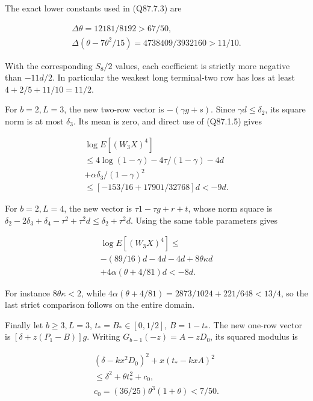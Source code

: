 The exact lower constants used in (Q87.7.3) are

\[
\begin{gathered}
\Delta\theta=12181/8192>67/50,\qquad\\
\Delta(\theta-7\theta^2/15)=4738409/3932160>11/10.
\end{gathered}
\]

With the corresponding \(S_8/2\) values, each coefficient is
strictly more negative than \(-11d/2\). In particular the weakest
long terminal-two row has loss at least \(4+2/5+11/10=\allowbreak 11/2\).

For \(b=\allowbreak 2,\allowbreak  L=\allowbreak 3\), the new two-row vector is \(-(\gamma g+s)\).
Since \(\gamma d\le\allowbreak  \delta_2\), its square norm is at most \(\delta_3\).
Its mean is zero, and direct use of (Q87.1.5) gives

\[
\begin{gathered}
\log E[(W_3X)^4]\\
\le4\log(1-\gamma)-4\tau/(1-\gamma)-4d\\
+\alpha \delta_3/(1-\gamma)^2\\
\le[-153/16+17901/32768]d<-9d.
\end{gathered}\tag{Q87.7.4}\label{eq:Q87:7.4}
\]

For \(b=\allowbreak 2,\allowbreak  L=\allowbreak 4\), the new vector is \(\tau1-\tau g+r+t\), whose
norm square is
\(\delta_2-2\delta_3+\delta_4-\tau^2+\tau^2d\le\allowbreak  \delta_2+\tau^2d\).
Using the same table parameters gives

\[
\begin{gathered}
\log E[(W_3X)^4]\le\\
-(89/16)d-4d-4d+8\theta\kappa d\\
+4\alpha(\theta+4/81)d<-8d.
\end{gathered}\tag{Q87.7.5}\label{eq:Q87:7.5}
\]

For instance \(8\theta\kappa<\allowbreak 2\), while
\(4\alpha(\theta+4/81)=\allowbreak 2873/1024+221/648<\allowbreak 13/4\), so the last
strict comparison follows on the entire domain.

Finally let \(b\ge\allowbreak 3,\allowbreak  L=\allowbreak 3\), \(t_*=\allowbreak B_*\in[0,\allowbreak  1/2]\), \(B=\allowbreak 1-t_*\).
The new one-row vector is \([\delta+z(P_1-B)]g\). Writing
\(G_{b-1}(-z)=\allowbreak A-zD_0\), its squared modulus is

\[
\begin{gathered}
(\delta-kx^2D_0)^2+x(t_*-kxA)^2\\
\le\delta^2+\theta t_*^2+c_0,\qquad\\
c_0=(36/25)\theta^3(1+\theta)<7/50.
\end{gathered}
\]

